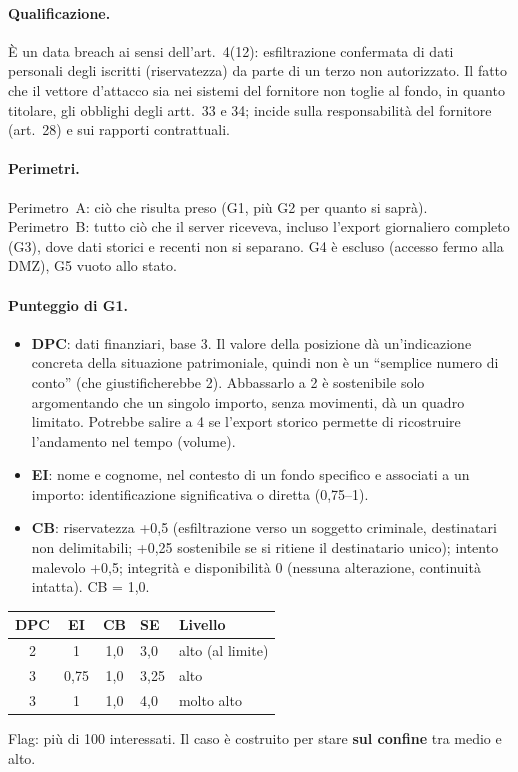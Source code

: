 \begin{integrazione}
\paragraph{Qualificazione.} È un data breach ai sensi dell'art.~4(12): esfiltrazione confermata di
dati personali degli iscritti (riservatezza) da parte di un terzo non autorizzato. Il fatto che il
vettore d'attacco sia nei sistemi del fornitore non toglie al fondo, in quanto titolare, gli obblighi
degli artt.~33 e 34; incide sulla responsabilità del fornitore (art.~28) e sui rapporti contrattuali.

\paragraph{Perimetri.} Perimetro~A: ciò che risulta preso (G1, più G2 per quanto si saprà). Perimetro~B:
tutto ciò che il server riceveva, incluso l'export giornaliero completo (G3), dove dati storici e
recenti non si separano. G4 è escluso (accesso fermo alla DMZ), G5 vuoto allo stato.

\paragraph{Punteggio di G1.}
\begin{itemize}
  \item \textbf{DPC}: dati finanziari, base 3. Il valore della posizione dà un'indicazione concreta
    della situazione patrimoniale, quindi non è un ``semplice numero di conto'' (che giustificherebbe
    2). Abbassarlo a 2 è sostenibile solo argomentando che un singolo importo, senza movimenti, dà un
    quadro limitato. Potrebbe salire a 4 se l'export storico permette di ricostruire l'andamento nel
    tempo (volume).
  \item \textbf{EI}: nome e cognome, nel contesto di un fondo specifico e associati a un importo:
    identificazione significativa o diretta (0,75--1).
  \item \textbf{CB}: riservatezza +0,5 (esfiltrazione verso un soggetto criminale, destinatari non
    delimitabili; +0,25 sostenibile se si ritiene il destinatario unico); intento malevolo +0,5;
    integrità e disponibilità 0 (nessuna alterazione, continuità intatta). CB = 1,0.
\end{itemize}
\begin{center}
\small
\begin{tabular}{cccll}
\toprule
\textbf{DPC} & \textbf{EI} & \textbf{CB} & \textbf{SE} & \textbf{Livello} \\ \midrule
2 & 1 & 1,0 & 3,0 & alto (al limite) \\
3 & 0,75 & 1,0 & 3,25 & alto \\
3 & 1 & 1,0 & 4,0 & molto alto \\
\bottomrule
\end{tabular}
\end{center}
Flag: più di 100 interessati. Il caso è costruito per stare \textbf{sul confine} tra medio e alto.


\end{integrazione}
